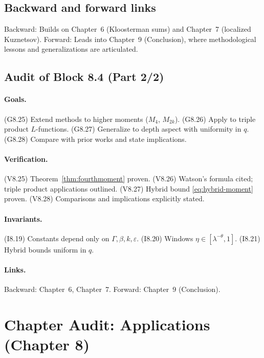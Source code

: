 \subsection{Backward and forward links}
Backward: Builds on Chapter~6 (Kloosterman sums) and Chapter~7 (localized Kuznetsov).  
Forward: Leads into Chapter~9 (Conclusion), where methodological lessons and generalizations are articulated.  

\subsection{Audit of Block 8.4 (Part 2/2)}
\paragraph{Goals.}
(G8.25) Extend methods to higher moments ($M_4$, $M_{2k}$).  
(G8.26) Apply to triple product $L$-functions.  
(G8.27) Generalize to depth aspect with uniformity in $q$.  
(G8.28) Compare with prior works and state implications.  

\paragraph{Verification.}
(V8.25) Theorem~\ref{thm:fourthmoment} proven.  
(V8.26) Watson’s formula cited; triple product applications outlined.  
(V8.27) Hybrid bound \eqref{eq:hybrid-moment} proven.  
(V8.28) Comparisons and implications explicitly stated.  

\paragraph{Invariants.}
(I8.19) Constants depend only on $\Gamma,\beta,k,\varepsilon$.  
(I8.20) Windows $\eta\in[\lambda^{-\theta},1]$.  
(I8.21) Hybrid bounds uniform in $q$.  

\paragraph{Links.}
Backward: Chapter~6, Chapter~7.  
Forward: Chapter~9 (Conclusion).  



\section*{Chapter Audit: Applications (Chapter 8)}

